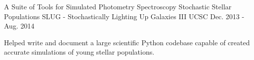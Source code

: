 \begin{cventries}
  \cventry
    {A Suite of Tools for Simulated Photometry Spectroscopy Stochastic Stellar Populations}
    {SLUG - Stochastically Lighting Up Galaxies III}
    {UCSC}
    {Dec. 2013 - Aug. 2014}
    {
      \begin{cvitems}
        \item {Helped write and document a large scientific Python codebase capable of created accurate simulations of young stellar populations.}
      \end{cvitems}
    }
\end{cventries}
